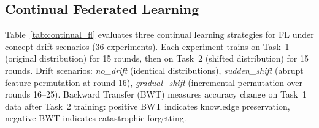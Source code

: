 \documentclass[conference,a4paper]{IEEEtran}
\begin{document}
\subsection{Continual Federated Learning}
\label{sec:continual_exp}

Table~\ref{tab:continual_fl} evaluates three continual learning strategies for FL under concept drift scenarios (36 experiments). Each experiment trains on Task~1 (original distribution) for 15 rounds, then on Task~2 (shifted distribution) for 15 rounds. Drift scenarios: \textit{no\_drift} (identical distributions), \textit{sudden\_shift} (abrupt feature permutation at round 16), \textit{gradual\_shift} (incremental permutation over rounds 16--25). Backward Transfer (BWT) measures accuracy change on Task~1 data after Task~2 training: positive BWT indicates knowledge preservation, negative BWT indicates catastrophic forgetting.
\end{document}
